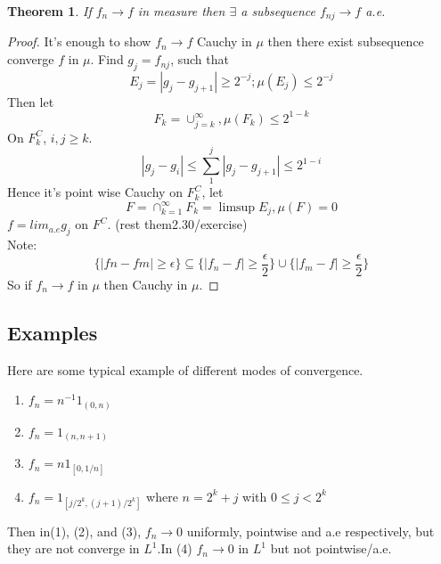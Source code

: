 \documentclass{article}
\newtheorem{theorem}{Theorem}[section]
\theoremstyle{definition}
\begin{document}
\begin{theorem}
	If $f_n \rightarrow f$ in measure then $\exists$ a subsequence $f_{nj}\rightarrow f$ a.e.
\end{theorem}

\begin{proof}
	It's enough to show $f_n\rightarrow f$ Cauchy in $\mu$ then there exist subsequence converge $f$ in $\mu$.
	Find $g_j=f_{nj}$, such that $$E_j={|g_j-g_{j+1}|\geq 2^{-j}}; \mu(E_j)\leq 2^{-j}$$
	Then let $$F_k=\cup_{j = k}^{\infty}, \mu(F_k)\leq 2^{1-k}$$
	On $F_{k}^C$, $i,j\geq k$. $$|g_j-g_i|\leq \sum_{1}^{j}|g_j-g_{j+1}|\leq 2^{1-i}$$
	 Hence it's point wise Cauchy on $F_k^C$, let $$F=\cap_{k=1}^{\infty}F_k=\limsup E_j, \mu(F)=0$$ $f=lim_{a.e} g_j$ on $F^C$.
		(rest them2.30/exercise)\\
		Note: $$\{|fn-fm|\geq \epsilon \} \subseteq \{|f_n-f|\geq \frac{\epsilon}{2}\}\cup \{|f_m-f|\geq \frac{\epsilon}{2} \}$$ So if $f_n\rightarrow f $ in $\mu$ then Cauchy in $\mu$.
\end{proof}
\pagebreak
\subsection{Examples}

Here are some typical example of different modes of convergence.
\begin{enumerate}[(1)]
\item $f_n=n^{-1}1_{(0,n)}$
\item $f_n=1_{(n,n+1)}$
\item $f_n=n1_{[0,1/n]}$
\item $f_n=1_{[j/2^k,(j+1)/2^k]}$ where $n=2^k+j$ with $0\leq j<2^k$
\end{enumerate}

Then in(1), (2), and (3), $f_n \rightarrow 0$ uniformly, pointwise and a.e respectively, but they are not converge in $L^1$.In (4) $f_n \rightarrow 0$ in $L^1$ but not pointwise/a.e.
\end{document}
